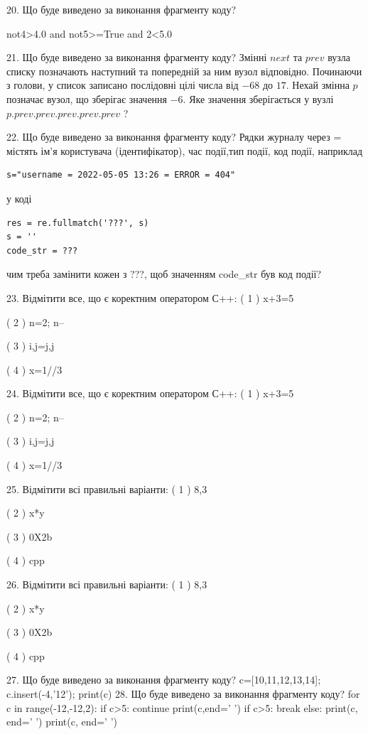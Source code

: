 \documentclass[11pt]{article}
\begin{document}
20. Що буде виведено за виконання фрагменту коду?

not4>4.0 and not5>=True and 2<5.0

21. Що буде виведено за виконання фрагменту коду?
Змінні $next$ та $prev$ вузла списку позначають наступний та попередній за ним вузол відповідно. Починаючи з голови, у список записано послідовні цілі числа від $-68$ до $17$. Нехай змінна $p$ позначає вузол, що зберігає значення $-6$.
Яке значення зберігається у вузлі $p.prev.prev.prev.prev.prev$ ?

22. Що буде виведено за виконання фрагменту коду?
Рядки журналу через = містять ім'я користувача (ідентифікатор), час події,тип події, код події, наприклад
\begin{verbatim}
s="username = 2022-05-05 13:26 = ERROR = 404"
\end{verbatim}
у коді 
\begin{verbatim}
res = re.fullmatch('???', s) 
s = ''
code_str = ??? 
\end{verbatim}
чим треба замінити кожен з ???, щоб значенням code\_str був код події? 



23. Відмітити все, що є коректним оператором С++:
( 1 ) x+3=5

( 2 ) n=2; n--

( 3 ) i,j=j,j

( 4 ) x=1//3

24. Відмітити все, що є коректним оператором С++:
( 1 ) x+3=5

( 2 ) n=2; n--

( 3 ) i,j=j,j

( 4 ) x=1//3

25. Відмітити всі правильні варіанти:
( 1 ) 8,3

( 2 ) x*y

( 3 ) 0X2b

( 4 ) cpp

26. Відмітити всі правильні варіанти:
( 1 ) 8,3

( 2 ) x*y

( 3 ) 0X2b

( 4 ) cpp

27. Що буде виведено за виконання фрагменту коду?
c=[10,11,12,13,14]; c.insert(-4,'12'); print(c)
28. Що буде виведено за виконання фрагменту коду?
for c in range(-12,-12,2):
    if c>5:
        continue
        print(c,end=' ')
    if c>5:
        break
else:
    print(c, end=' ')
print(c, end=' ')
\end{document}
